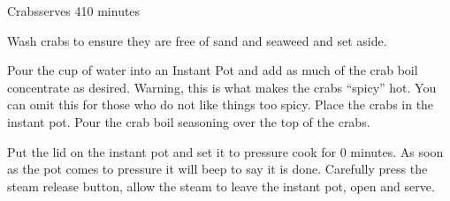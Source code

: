 \begin{recipe}{Crabs}{serves 4}{10 minutes}

  Wash crabs to ensure they are free of sand and seaweed and set aside.


  Pour the cup of water into an Instant Pot and add as much of the crab boil concentrate as desired.  Warning, this is what makes the crabs ``spicy'' hot.  You can omit this for those who do not like things too spicy.  Place the crabs in the instant pot.  Pour the crab boil seasoning over the top of the crabs.

  Put the lid on the instant pot and set it to pressure cook for 0 minutes.  As soon as the pot comes to pressure it will beep to say it is done.  Carefully press the steam release button, allow the steam to leave the instant pot, open and serve.
  
\end{recipe}
